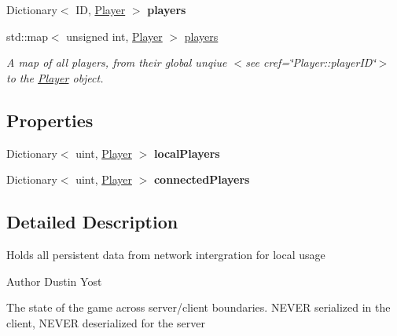 \begin{DoxyCompactItemize}
\item 
\hypertarget{class_game_state_aed9c4cf83c497c6e36585e0ed3999564}{Dictionary$<$ I\-D, \hyperlink{class_game_state_1_1_player}{Player} $>$ {\bfseries players}}\label{class_game_state_aed9c4cf83c497c6e36585e0ed3999564}

\item 
\hypertarget{class_game_state_a8f156a6cce5f2b9945c274b6bfc971ce}{std\-::map$<$ unsigned int, \hyperlink{class_game_state_1_1_player}{Player} $>$ \hyperlink{class_game_state_a8f156a6cce5f2b9945c274b6bfc971ce}{players}}\label{class_game_state_a8f156a6cce5f2b9945c274b6bfc971ce}

\begin{DoxyCompactList}\small\item\em A map of all players, from their global unqiue $<$see cref=\char`\"{}\-Player\-::player\-I\-D\char`\"{}$>$ to the \hyperlink{class_game_state_1_1_player}{Player} object. \end{DoxyCompactList}\end{DoxyCompactItemize}
\subsection*{Properties}
\begin{DoxyCompactItemize}
\item 
\hypertarget{class_game_state_a3fe38a9e11fe72dd4bc4796e1d4a6c1b}{Dictionary$<$ uint, \hyperlink{class_game_state_1_1_player}{Player} $>$ {\bfseries local\-Players}}\label{class_game_state_a3fe38a9e11fe72dd4bc4796e1d4a6c1b}

\item 
\hypertarget{class_game_state_ad0f225ac26f38bf21be10d35a1cd6011}{Dictionary$<$ uint, \hyperlink{class_game_state_1_1_player}{Player} $>$ {\bfseries connected\-Players}}\label{class_game_state_ad0f225ac26f38bf21be10d35a1cd6011}

\end{DoxyCompactItemize}


\subsection{Detailed Description}
Holds all persistent data from network intergration for local usage 

\begin{DoxyAuthor}{Author}
Dustin Yost
\end{DoxyAuthor}
The state of the game across server/client boundaries. N\-E\-V\-E\-R serialized in the client, N\-E\-V\-E\-R deserialized for the server 

